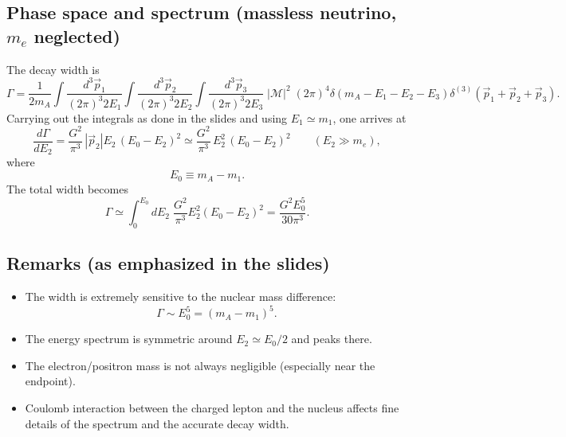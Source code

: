 \subsection{Phase space and spectrum (massless neutrino, $m_e$ neglected)}
The decay width is
\begin{equation}
\Gamma
=
\frac{1}{2m_A}
\int\frac{d^3\vec p_1}{(2\pi)^3 2E_1}
\int\frac{d^3\vec p_2}{(2\pi)^3 2E_2}
\int\frac{d^3\vec p_3}{(2\pi)^3 2E_3}\;
|\mathcal{M}|^2\;
(2\pi)^4\delta(m_A-E_1-E_2-E_3)\delta^{(3)}(\vec p_1+\vec p_2+\vec p_3).
\end{equation}
Carrying out the integrals as done in the slides and using $E_1\simeq m_1$, one arrives at
\begin{equation}
\frac{d\Gamma}{dE_2}
=
\frac{G^2}{\pi^3}\,|\vec p_2|E_2\,(E_0-E_2)^2
\simeq
\frac{G^2}{\pi^3}\,E_2^2\,(E_0-E_2)^2
\qquad (E_2\gg m_e),
\end{equation}
where
\begin{equation}
E_0 \equiv m_A-m_1.
\end{equation}
The total width becomes
\begin{equation}
\boxed{
\Gamma
\simeq
\int_0^{E_0}dE_2\;\frac{G^2}{\pi^3}E_2^2(E_0-E_2)^2
=
\frac{G^2 E_0^5}{30\pi^3}.
}
\end{equation}

\subsection{Remarks (as emphasized in the slides)}
\begin{itemize}
  \item The width is extremely sensitive to the nuclear mass difference:
        \begin{equation}
        \Gamma\sim E_0^5=(m_A-m_1)^5.
        \end{equation}
  \item The energy spectrum is symmetric around $E_2\simeq E_0/2$ and peaks there.
  \item The electron/positron mass is not always negligible (especially near the endpoint).
  \item Coulomb interaction between the charged lepton and the nucleus affects fine details of the spectrum
        and the accurate decay width.
\end{itemize}

